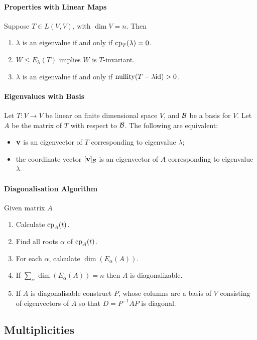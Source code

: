 \paragraph{Properties with Linear Maps}
Suppose \(T \in L(V,V)\), with \(\dim V = n\). Then
\begin{enumerate}
    \item \(\lambda\) is an eigenvalue if and only if \(\mathrm{cp}_T(\lambda) = 0\).
    \item \(W \leq E_\lambda(T)\) implies \(W\) is \(T\)-invariant.
    \item \(\lambda\) is an eigenvalue if and only if \(\mathrm{nullity}(T - \lambda\mathrm{id}) > 0\).
\end{enumerate}

\paragraph{Eigenvalues with Basis}
Let \(T: V \to V\) be linear on finite dimensional space \(V\), and \(\mathcal{B}\) be a basis for \(V\). Let \(A\) be the matrix of \(T\) with respect to \(\mathcal{B}\). The following are equivalent:
\begin{itemize}
    \item \(\mathbf{v}\) is an eigenvector of \(T\) corresponding to eigenvalue \(\lambda\);
    \item the coordinate vector \([\mathbf{v}]_{\mathcal{B}}\) is an eigenvector of \(A\) corresponding to eigenvalue \(\lambda\).
\end{itemize}

\paragraph{Diagonalisation Algorithm}
Given matrix \(A\)
\begin{enumerate}
    \item Calculate \(\mathrm{cp}_A(t)\).
    \item Find all roots \(\alpha\) of \(\mathrm{cp}_A(t)\).
    \item For each \(\alpha\), calculate \(\dim(E_\alpha(A))\).
    \item If \(\sum_\alpha \dim(E_\alpha(A)) = n\) then \(A\) is diagonalizable.
    \item If \(A\) is diagonalisable construct \(P\), whose columns are a basis of \(V\) consisting of eigenvectors of \(A\) so that \(D = P^{-1}AP\) is diagonal.
\end{enumerate}

\subsection{Multiplicities}
